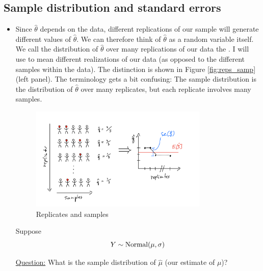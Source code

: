 \subsection{Sample distribution and standard errors}
\begin{itemize}

\item Since $\hat{\theta}$ depends on the data, different replications of our sample will generate different values of $\hat{\theta}$. We can therefore think of $\hat{\theta}$ as a random variable itself.  We call the distribution of $\hat{\theta}$ over many replications of our data the . I will use  to mean different realizations of our data (as opposed to the different samples within the data). The distinction is shown in Figure \ref{fig:reps_samp} (left panel). The terminology gets a bit confusing: The sample distribution is the distribution of $\hat{\theta}$ over many replicates, but each replicate involves many samples. 

\begin{figure}[h]
\centering
\includegraphics[width=0.8\textwidth]{./../figures/replicates}
\caption{Replicates and samples }\label{fig:rep_samp}
\end{figure}


\begin{example}
Suppose 
\begin{equation*}
Y \sim {\rm Normal}(\mu,\sigma)
\end{equation*}


\noindent
\underline{Question:} What is the sample distribution of $\hat{\mu}$ (our estimate of $\mu$)?\\


\end{example}
\end{itemize}
